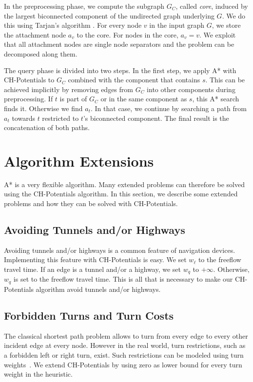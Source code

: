 \documentclass[letterpaper]{article} %
\begin{document}
In the preprocessing phase, we compute the subgraph $G_C$, called \emph{core}, induced by the largest biconnected component of the undirected graph underlying $G$.
We do this using Tarjan's algorithm \cite{t-dfslg2-72}.
For every node $v$ in the input graph $G$, we store the attachment node $a_v$ to the core.
For nodes in the core, $a_v=v$.
We exploit that all attachment nodes are single node separators and the problem can be decomposed along them.

The query phase is divided into two steps.
In the first step, we apply A* with CH-Potentials to $G_C$ combined with the component that contains $s$.
This can be achieved implicitly by removing edges from $G_C$ into other components during preprocessing.
If $t$ is part of $G_C$ or in the same component as $s$, this A* search finds it.
Otherwise we find $a_t$.
In that case, we continue by searching a path from $a_t$ towards $t$ restricted to $t$'s biconnected component.
The final result is the concatenation of both paths.

\section{Algorithm Extensions}
\label{sec:extensions}

A* is a very flexible algorithm.
Many extended problems can therefore be solved using the CH-Potentials algorithm.
In this section, we describe some extended problems and how they can be solved with CH-Potentials.

\subsection{Avoiding Tunnels and/or Highways}
\label{sec:no-tunnel-highway}

Avoiding tunnels and/or highways is a common feature of navigation devices.
Implementing this feature with CH-Potentials is easy.
We set $w_\ell$ to the freeflow travel time.
If an edge is a tunnel and/or a highway, we set $w_q$ to $+\infty$.
Otherwise, $w_q$ is set to the freeflow travel time.
This is all that is necessary to make our CH-Potentials algorithm avoid tunnels and/or highways.

\subsection{Forbidden Turns and Turn Costs}
\label{sec:no-turns}

The classical shortest path problem allows to turn from every edge to every other incident edge at every node.
However in the real world, turn restrictions, such as a forbidden left or right turn, exist.
Such restrictions can be modeled using turn weights~\cite{gv-errnt-11,dgpw-crprn-13,bwzz-cchtc-20}.
We extend CH-Potentials by using zero as lower bound for every turn weight in the heuristic.
\end{document}
